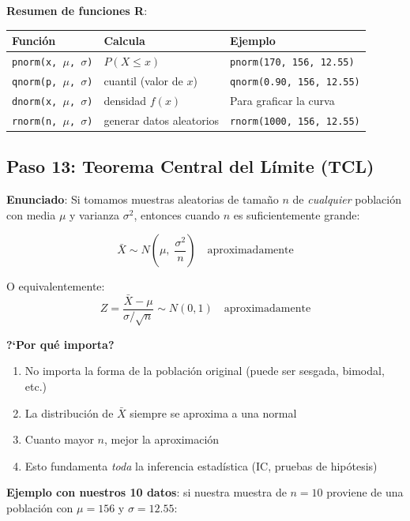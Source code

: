 \documentclass[11pt, a4paper]{article}
\begin{document}
\textbf{Resumen de funciones R}:

\begin{center}
\begin{tabular}{lll}
\toprule
\textbf{Funci\'on} & \textbf{Calcula} & \textbf{Ejemplo} \\
\midrule
\texttt{pnorm(x, $\mu$, $\sigma$)} & $P(X \leq x)$ & \texttt{pnorm(170, 156, 12.55)} \\
\texttt{qnorm(p, $\mu$, $\sigma$)} & cuantil (valor de $x$) & \texttt{qnorm(0.90, 156, 12.55)} \\
\texttt{dnorm(x, $\mu$, $\sigma$)} & densidad $f(x)$ & Para graficar la curva \\
\texttt{rnorm(n, $\mu$, $\sigma$)} & generar datos aleatorios & \texttt{rnorm(1000, 156, 12.55)} \\
\bottomrule
\end{tabular}
\end{center}

\subsection{Paso 13: Teorema Central del L\'imite (TCL)}

\textbf{Enunciado}: Si tomamos muestras aleatorias de tama\~no $n$ de \emph{cualquier}
poblaci\'on con media $\mu$ y varianza $\sigma^2$, entonces cuando $n$ es suficientemente grande:

\[
\boxed{\bar{X} \sim N\!\left(\mu, \;\frac{\sigma^2}{n}\right)} \quad \text{aproximadamente}
\]

O equivalentemente:
\[
Z = \frac{\bar{X} - \mu}{\sigma / \sqrt{n}} \sim N(0, 1) \quad \text{aproximadamente}
\]

\textbf{?`Por qu\'e importa?}
\begin{enumerate}
  \item No importa la forma de la poblaci\'on original (puede ser sesgada, bimodal, etc.)
  \item La distribuci\'on de $\bar{X}$ siempre se aproxima a una normal
  \item Cuanto mayor $n$, mejor la aproximaci\'on
  \item Esto fundamenta \emph{toda} la inferencia estad\'istica (IC, pruebas de hip\'otesis)
\end{enumerate}

\textbf{Ejemplo con nuestros 10 datos}: si nuestra muestra de $n = 10$ proviene
de una poblaci\'on con $\mu = 156$ y $\sigma = 12.55$:
\end{document}
